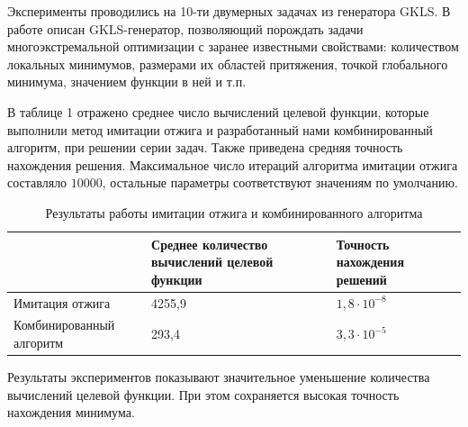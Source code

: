 \documentclass[11pt, oneside, a4paper]{article}
\begin{document}
\newpage



Эксперименты проводились на 10-ти двумерных задачах из генератора GKLS. В работе \cite{fio_bib21} \cite{fio_bib22} описан GKLS-генератор, позволяющий порождать задачи многоэкстремальной оптимизации с заранее известными свойствами: количеством локальных минимумов, размерами их областей притяжения, точкой глобального минимума, значением функции в ней и т.п. 

В таблице 1 отражено среднее число вычислений целевой функции, которые выполнили метод имитации отжига и разработанный нами комбинированный алгоритм, при решении серии задач. Также приведена средняя точность нахождения решения. Максимальное число итераций алгоритма имитации отжига составляло $10000$, остальные параметры соответствуют значениям по умолчанию. 

\begin{table}
	\caption{Результаты работы имитации отжига и комбинированного алгоритма}
	\begin{center}
		\begin{tabular}{|m{3.8cm}|m{6cm} |m{6cm}|}
			\hline
			 & Среднее количество вычислений целевой функции & Точность нахождения решений\\
			 \hline
			 Имитация отжига & 4255,9 & $1,8 \cdot 10^{-8}$\\
			 \hline 
			 Комбинированный алгоритм & 293,4 & $3,3 \cdot 10^{-5}$\\
			 \hline
		\end{tabular}
	\end{center}
\end{table}

Результаты экспериментов показывают значительное уменьшение количества вычислений целевой функции. При этом сохраняется высокая точность нахождения минимума.
\end{document}
